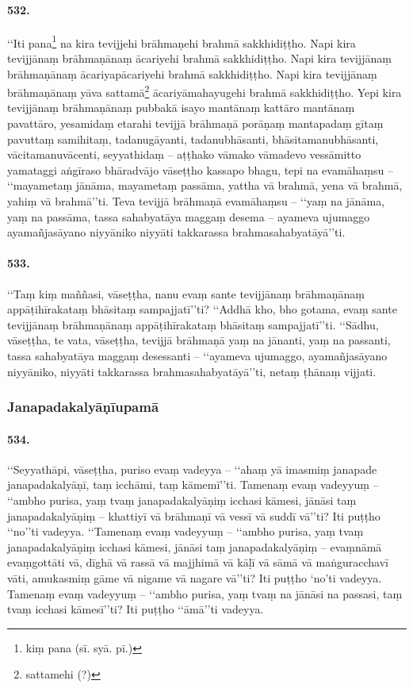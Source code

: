 \paragraph{532.} ‘‘Iti pana\footnote{kiṃ pana (sī. syā. pī.)} na kira tevijjehi brāhmaṇehi brahmā sakkhidiṭṭho. Napi kira tevijjānaṃ brāhmaṇānaṃ ācariyehi brahmā sakkhidiṭṭho. Napi kira tevijjānaṃ brāhmaṇānaṃ ācariyapācariyehi brahmā sakkhidiṭṭho. Napi kira tevijjānaṃ brāhmaṇānaṃ yāva sattamā\footnote{sattamehi (?)} ācariyāmahayugehi brahmā sakkhidiṭṭho. Yepi kira tevijjānaṃ brāhmaṇānaṃ pubbakā isayo mantānaṃ kattāro mantānaṃ pavattāro, yesamidaṃ etarahi tevijjā brāhmaṇā porāṇaṃ mantapadaṃ gītaṃ pavuttaṃ samihitaṃ, tadanugāyanti, tadanubhāsanti, bhāsitamanubhāsanti, vācitamanuvācenti, seyyathidaṃ – aṭṭhako vāmako vāmadevo vessāmitto yamataggi aṅgīraso bhāradvājo vāseṭṭho kassapo bhagu, tepi na evamāhaṃsu – ‘‘mayametaṃ jānāma, mayametaṃ passāma, yattha vā brahmā, yena vā brahmā, yahiṃ vā brahmā’’ti. Teva tevijjā brāhmaṇā evamāhaṃsu – ‘‘yaṃ na jānāma, yaṃ na passāma, tassa sahabyatāya maggaṃ desema – ayameva ujumaggo ayamañjasāyano niyyāniko niyyāti takkarassa brahmasahabyatāyā’’ti.

\paragraph{533.} ‘‘Taṃ kiṃ maññasi, vāseṭṭha, nanu evaṃ sante tevijjānaṃ brāhmaṇānaṃ appāṭihīrakataṃ bhāsitaṃ sampajjatī’’ti? ‘‘Addhā kho, bho gotama, evaṃ sante tevijjānaṃ brāhmaṇānaṃ appāṭihīrakataṃ bhāsitaṃ sampajjatī’’ti. ‘‘Sādhu, vāseṭṭha, te vata, vāseṭṭha, tevijjā brāhmaṇā yaṃ na jānanti, yaṃ na passanti, tassa sahabyatāya maggaṃ desessanti – ‘‘ayameva ujumaggo, ayamañjasāyano niyyāniko, niyyāti takkarassa brahmasahabyatāyā’’ti, netaṃ ṭhānaṃ vijjati.

\subsubsection{Janapadakalyāṇīupamā}

\paragraph{534.} ‘‘Seyyathāpi, vāseṭṭha, puriso evaṃ vadeyya – ‘‘ahaṃ yā imasmiṃ janapade janapadakalyāṇī, taṃ icchāmi, taṃ kāmemī’’ti. Tamenaṃ evaṃ vadeyyuṃ – ‘‘ambho purisa, yaṃ tvaṃ janapadakalyāṇiṃ icchasi kāmesi, jānāsi taṃ janapadakalyāṇiṃ – khattiyī vā brāhmaṇī vā vessī vā suddī vā’’ti? Iti puṭṭho ‘‘no’’ti vadeyya. ‘‘Tamenaṃ evaṃ vadeyyuṃ – ‘‘ambho purisa, yaṃ tvaṃ janapadakalyāṇiṃ icchasi kāmesi, jānāsi taṃ janapadakalyāṇiṃ – evaṃnāmā evaṃgottāti vā, dīghā vā rassā vā majjhimā vā kāḷī vā sāmā vā maṅguracchavī vāti, amukasmiṃ gāme vā nigame vā nagare vā’’ti? Iti puṭṭho ‘no’ti vadeyya. Tamenaṃ evaṃ vadeyyuṃ – ‘‘ambho purisa, yaṃ tvaṃ na jānāsi na passasi, taṃ tvaṃ icchasi kāmesī’’ti? Iti puṭṭho ‘‘āmā’’ti vadeyya.

